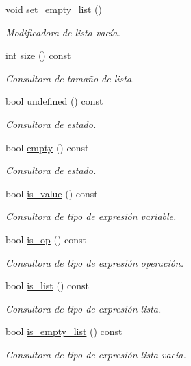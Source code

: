 \begin{DoxyCompactItemize}
void \hyperlink{class_expression_a1e0ff9e6ef7b9b96466300509decab24}{set\+\_\+empty\+\_\+list} ()
\begin{DoxyCompactList}\small\item\em Modificadora de lista vacía. \end{DoxyCompactList}\item 
int \hyperlink{class_expression_a0e8980139631cf7bc9fd3bca9d8caddc}{size} () const 
\begin{DoxyCompactList}\small\item\em Consultora de tamaño de lista. \end{DoxyCompactList}\item 
bool \hyperlink{class_expression_a97f9b6fc78a7ef17dd9595e53a9b6239}{undefined} () const 
\begin{DoxyCompactList}\small\item\em Consultora de estado. \end{DoxyCompactList}\item 
bool \hyperlink{class_expression_a0020daf119d82799da034fd0513ca614}{empty} () const 
\begin{DoxyCompactList}\small\item\em Consultora de estado. \end{DoxyCompactList}\item 
bool \hyperlink{class_expression_a4ee60df2f212d8a4cc228ce7db2da81b}{is\+\_\+value} () const 
\begin{DoxyCompactList}\small\item\em Consultora de tipo de expresión variable. \end{DoxyCompactList}\item 
bool \hyperlink{class_expression_a422fb496720b177eaed37a9694613384}{is\+\_\+op} () const 
\begin{DoxyCompactList}\small\item\em Consultora de tipo de expresión operación. \end{DoxyCompactList}\item 
bool \hyperlink{class_expression_ae835c069faf7d6821fe6037e384f02c0}{is\+\_\+list} () const 
\begin{DoxyCompactList}\small\item\em Consultora de tipo de expresión lista. \end{DoxyCompactList}\item 
bool \hyperlink{class_expression_a776684354326520add7a3ca54a14f4f8}{is\+\_\+empty\+\_\+list} () const 
\begin{DoxyCompactList}\small\item\em Consultora de tipo de expresión lista vacía. \end{DoxyCompactList}\item 

\end{DoxyCompactItemize}

